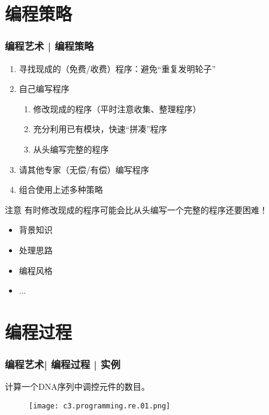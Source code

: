 \section{编程策略}
\begin{frame}
  \frametitle{编程艺术 | \alert{编程策略}}
  \begin{enumerate}
    \item 寻找现成的（免费/收费）程序：避免“重复发明轮子”
    \item 自己编写程序
      \begin{enumerate}
	\item 修改现成的程序（平时注意收集、整理程序）
	\item 充分利用已有模块，快速“拼凑”程序
	\item 从头编写完整的程序
      \end{enumerate}
    \item 请其他专家（无偿/有偿）编写程序
    \item 组合使用上述多种策略
  \end{enumerate}
  \pause
  \begin{block}{注意}
    有时修改现成的程序可能会比从头编写一个完整的程序还要困难！
    \begin{itemize}
      \item 背景知识
      \item 处理思路
      \item 编程风格
      \item ...
    \end{itemize}
  \end{block}
\end{frame}

\section{编程过程}
\begin{frame}
  \frametitle{编程艺术| 编程过程 | 实例}
  \begin{center}
    {\Large 计算一个DNA序列中调控元件的数目。}
  \end{center}
  \begin{figure}
    \centering
    \texttt{[image: c3.programming.re.01.png]}
  \end{figure}
\end{frame}

